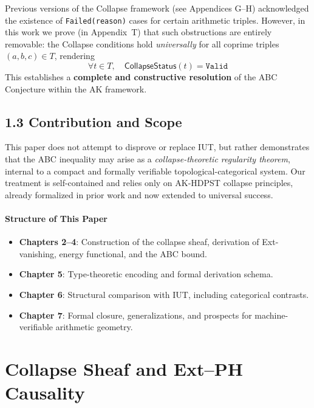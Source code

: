 \documentclass[11pt]{article}
\begin{document}
Previous versions of the Collapse framework (see Appendices G--H) acknowledged the existence of \texttt{Failed(reason)} cases for certain arithmetic triples. However, in this work we prove (in Appendix~T) that such obstructions are entirely removable: the Collapse conditions hold \emph{universally} for all coprime triples \( (a,b,c) \in T \), rendering
\[
\forall t \in T,\quad \mathsf{CollapseStatus}(t) = \texttt{Valid}
\]
This establishes a \textbf{complete and constructive resolution} of the ABC Conjecture within the AK framework.

\subsection*{1.3 Contribution and Scope}

This paper does not attempt to disprove or replace IUT, but rather demonstrates that the ABC inequality may arise as a \emph{collapse-theoretic regularity theorem}, internal to a compact and formally verifiable topological-categorical system. Our treatment is self-contained and relies only on AK-HDPST collapse principles, already formalized in prior work and now extended to universal success.

\paragraph{Structure of This Paper}

\begin{itemize}
    \item \textbf{Chapters 2--4}: Construction of the collapse sheaf, derivation of Ext-vanishing, energy functional, and the ABC bound.
    \item \textbf{Chapter 5}: Type-theoretic encoding and formal derivation schema.
    \item \textbf{Chapter 6}: Structural comparison with IUT, including categorical contrasts.
    \item \textbf{Chapter 7}: Formal closure, generalizations, and prospects for machine-verifiable arithmetic geometry.
\end{itemize}




\section{Collapse Sheaf and Ext--PH Causality}
\end{document}
